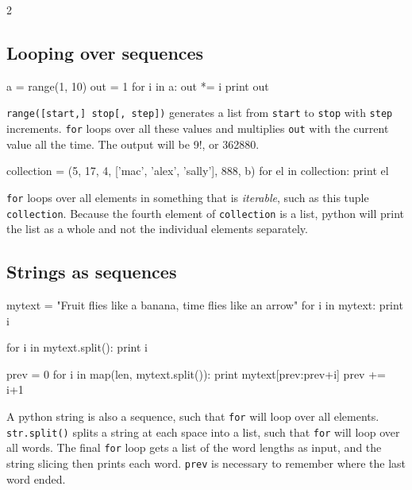 \documentclass[draft=false]{article}
\newcommand{\answer}[1]{#1}%
\def\pythoni{\lstinline[language=pythontim]}
\begin{document}
\begin{multicols}{2}

\subsection{Looping over sequences}

\begin{python}
a = range(1, 10)
out = 1
for i in a:
	out *= i
print out
\end{python}

\answer{\pythoni{range([start,] stop[, step])} generates a list from \pythoni{start} to \pythoni{stop} with \pythoni{step} increments. \pythoni{for} loops over all these values and multiplies \pythoni{out} with the current value all the time. The output will be 9!, or 362880.}

\begin{python}
collection = (5, 17, 4, ['mac', 'alex', 'sally'], 888, b)
for el in collection:
	print el
\end{python}

\answer{\pythoni{for} loops over all elements in something that is \emph{iterable}, such as this tuple \pythoni{collection}. Because the fourth element of \pythoni{collection} is a list, python will print the list as a whole and not the individual elements separately.}

\columnbreak

\subsection{Strings as sequences}

\begin{python}
mytext = "Fruit flies like a banana, time flies like 
	an arrow"
for i in mytext:
	print i

for i in mytext.split():
	print i

prev = 0
for i in map(len, mytext.split()):
	print mytext[prev:prev+i]
	prev += i+1
\end{python}

\answer{A python string is also a sequence, such that \pythoni{for} will loop over all elements. \pythoni{str.split()} splits a string at each space into a list, such that \pythoni{for} will loop over all words. The final \pythoni{for} loop gets a list of the word lengths as input, and the string slicing then prints each word. \pythoni{prev} is necessary to remember where the last word ended.}

\end{multicols}
\end{document}
